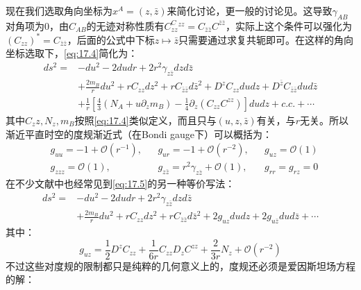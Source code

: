 现在我们选取角向坐标为$x^A=(z,\bar z)$来简化讨论，更一般的讨论见\cite{Compere:2019qed}。这导致$\gamma_{AB}$对角项为0，由$C_{AB}$的无迹对称性质有$C_{zz}^C^{zz}=C_{\bar z\bar z}C^{\bar z\bar z}$，实际上这个条件可以强化为$(C_{zz})^*=C_{\bar z\bar z}$，后面的公式中下标$z\mapsto \bar z$只需要通过求复共轭即可。在这样的角向坐标选取下，\ref{eq:17.4}简化为：
\begin{equation}\label{eq:17.5}
	\begin{aligned}
		ds^2=&-du^2-2dudr+2r^2\gamma_{z\bar z}dzd{\bar z}\\
		&+\frac{2m_B}{r}du^2+rC_{zz}dz^2+rC_{\bar z\bar z}d{\bar z}^2+D^z C_{zz}dudz+D^{\bar z}C_{\bar z\bar z}dud\bar z\\
		&+\frac{1}{r}\left[\frac{4}{3}\left(N_A+u\partial_zm_B\right)-\frac{1}{4}\partial_z\left(C_{zz}C^{zz}\right)\right]dudz+c.c.+\cdots
	\end{aligned}
\end{equation}
其中$C_zz,N_z,m_B$按照\ref{eq:17.4}类似定义，而且只与$(u,z,\bar z)$有关，与$r$无关。所以渐近平直时空的度规渐近式（在Bondi gauge下）可以概括为：
\begin{align*}
	&g_{uu}=-1+\mathcal{O}(r^{-1}),&&g_{ur}=-1+\mathcal{O}(r^{-2}),&&g_{uz}=\mathcal{O}(1)\\
	&g_{zzz}=\mathcal{O}(1),&&g_{z\bar z}=r^2\gamma_{z\bar z}+\mathcal{O}(1),&&g_{rr}=g_{rz}=0
\end{align*}
在不少文献中\cite{Pasterski:2021rjz,Kapec:2014opa,Raclariu:2021zjz}也经常见到\ref{eq:17.5}的另一种等价写法：
\begin{equation}\label{eq:17.6}
	\begin{aligned}
		ds^2=&-du^2-2dudr+2r^2\gamma_{z\bar z}dzd{\bar z}\\
		&+\frac{2m_B}{r}du^2+rC_{zz}dz^2+rC_{\bar z\bar z}d{\bar z}^2+2g_{uz}dudz+2g_{u\bar z}dud\bar z+\cdots
	\end{aligned}
\end{equation}
其中：
\begin{equation}
	g_{uz}=\frac{1}{2}D^zC_{zz}+\frac{1}{6r}C_{zz}D_zC^{zz}+\frac{2}{3r}N_z+\mathcal{O}(r^{-2})
\end{equation}
不过这些对度规的限制都只是纯粹的几何意义上的，度规还必须是爱因斯坦场方程的解：
